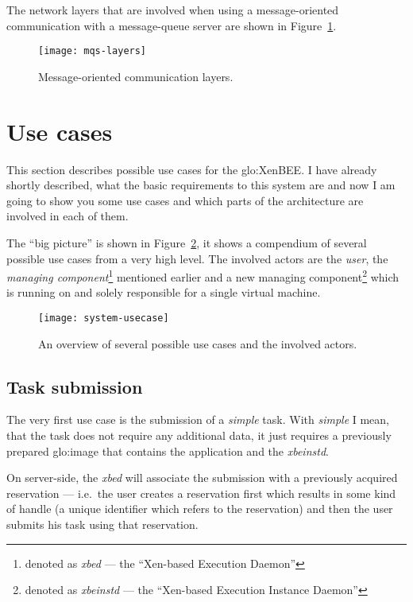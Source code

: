 The  network  layers  that  are  involved when  using  a  message-oriented
communication    with    a    message-queue    server   are    shown    in
Figure~\ref{fig:mqs-layers}.

\begin{figure}[htbp]
  \centering
  \texttt{[image: mqs-layers]}
  \caption[Message Layers]{Message-oriented communication layers.}
  \label{fig:mqs-layers}
\end{figure}


\section{Use cases}
\label{sec:use-cases}

This section describes possible use cases for the \gls{glo:XenBEE}. I have
already shortly described, what the  basic requirements to this system are
and now  I am  going to show  you some  use cases and  which parts  of the
architecture are involved in each of them.

The ``big picture'' is shown in Figure~\ref{fig:system-usecases}, it shows
a compendium  of several possible  use cases from  a very high  level. The
involved    actors    are     the    \emph{user},    the    \emph{managing
  component}\footnote{denoted as \emph{xbed} --- the ``Xen-based Execution
  Daemon''}     mentioned      earlier     and     a      new     managing
component\footnote{denoted   as   \emph{xbeinstd}   ---  the   ``Xen-based
  Execution Instance Daemon''} which  is running on and solely responsible
for a single virtual machine.

\begin{figure}[htbp]
  \centering
  \texttt{[image: system-usecase]}
  \caption[Use case  overview]{An overview  of several possible  use cases
    and the involved actors.}
  \label{fig:system-usecases}
\end{figure}

\subsection{Task submission}
\label{sec:uc-task-submission}

The very  first use case is  the submission of a  \emph{simple} task. With
\emph{simple} I mean, that the  task does not require any additional data,
it just  requires a previously prepared \gls{glo:image}  that contains the
application and the \emph{xbeinstd}.

On  server-side, the  \emph{xbed}  will associate  the  submission with  a
previously acquired  reservation ---  i.e.~the user creates  a reservation
first  which results in  some kind  of handle  (a unique  identifier which
refers to the  reservation) and then the user submits  his task using that
reservation.

